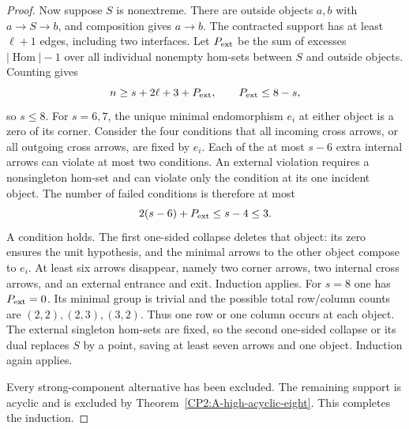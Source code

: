 \begin{proof}
Now suppose $S$ is nonextreme.  There are outside
objects $a,b$ with $a\to S\to b$, and composition
gives $a\to b$.  The contracted support has at least
$\ell+1$ edges, including two interfaces.  Let
$P_{\rm ext}$ be the sum of excesses $|\operatorname{Hom}|-1$
over all individual nonempty hom-sets between $S$ and
outside objects.  Counting gives
\[
 n\geq s+2\ell+3+P_{\rm ext},\qquad
 P_{\rm ext}\leq8-s,
\]
so $s\leq8$.  For $s=6,7$, the unique minimal
endomorphism $e_i$ at either object is a zero of its
corner.  Consider the four conditions that all incoming
cross arrows, or all outgoing cross arrows, are fixed
by $e_i$.  Each of the at most $s-6$ extra internal
arrows can violate at most two conditions.  An external
violation requires a nonsingleton hom-set and can
violate only the condition at its one incident object.
The number of failed conditions is therefore at most
\[
 2(s-6)+P_{\rm ext}\leq s-4\leq3.
\]
A condition holds.  The first one-sided collapse
deletes that object: its zero ensures the unit
hypothesis, and the minimal arrows to the other
object compose to $e_i$.  At least six arrows
disappear, namely two corner arrows, two internal
cross arrows, and an external entrance and exit.
Induction applies.  For $s=8$ one has
$P_{\rm ext}=0$.  Its minimal group is trivial and
the possible total row/column counts are
$(2,2),(2,3),(3,2)$.  Thus one row or one column occurs
at each object.  The external singleton hom-sets are
fixed, so the second one-sided collapse or its dual
replaces $S$ by a point, saving at least seven arrows
and one object.  Induction again applies.

Every strong-component alternative has been excluded.
The remaining support is acyclic and is excluded by
Theorem~\ref{CP2:A-high-acyclic-eight}.  This completes
the induction.
\end{proof}

